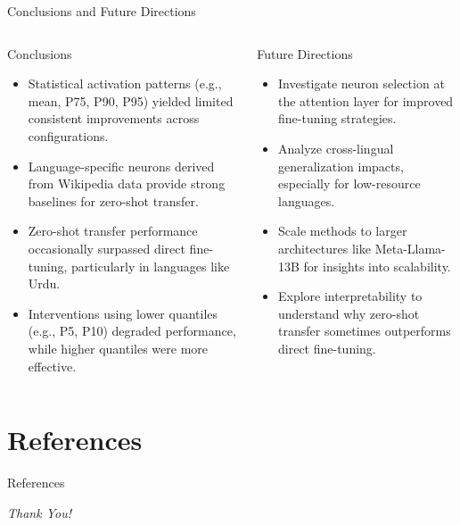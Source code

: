 \documentclass[aspectratio=169]{beamer}
\begin{document}
\begin{frame}{Conclusions and Future Directions}
	\begin{columns}
		\begin{block}{\scriptsize Conclusions}\scriptsize
			\begin{itemize}
				\item Statistical activation patterns (e.g., mean, P75, P90, P95) yielded limited consistent improvements across configurations.
				\item Language-specific neurons derived from Wikipedia data provide strong baselines for zero-shot transfer.
				\item Zero-shot transfer performance occasionally surpassed direct fine-tuning, particularly in languages like Urdu.
				\item Interventions using lower quantiles (e.g., P5, P10) degraded performance, while higher quantiles were more effective.
			\end{itemize}		  
		\end{block}
		\begin{block}{\scriptsize Future Directions}\scriptsize
			\begin{itemize}
				\item Investigate neuron selection at the attention layer for improved fine-tuning strategies.
				\item Analyze cross-lingual generalization impacts, especially for low-resource languages.
				\item Scale methods to larger architectures like Meta-Llama-13B for insights into scalability.
				\item Explore interpretability to understand why zero-shot transfer sometimes outperforms direct fine-tuning.
			\end{itemize}
		\end{block}
	\end{columns}
\end{frame}


	\section{References}
	\begin{frame}{References}
		\begin{block}{}\scriptsize
			\printbibliography
		\end{block}
	\end{frame}
	
	\begin{frame}{}
		\centering \Huge
		\emph{Thank You!}
	\end{frame}
	
\end{document}
